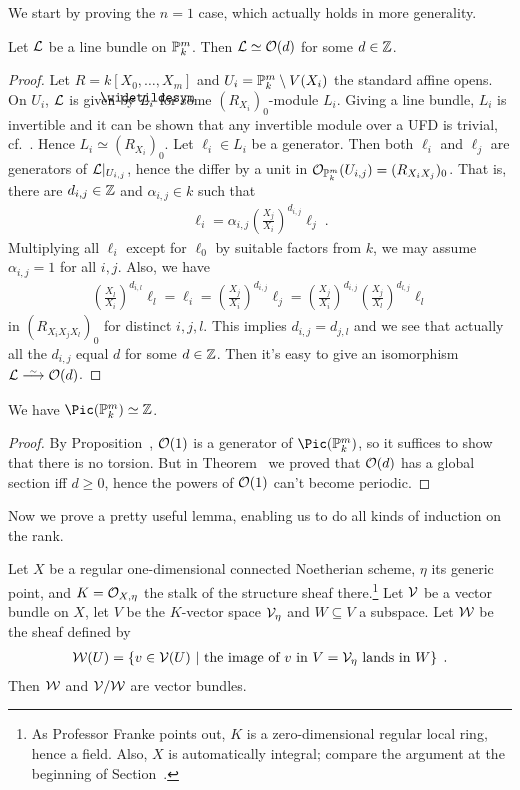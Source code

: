 \documentclass[a4paper,parskip=half,numbers=enddot, DIV=12]{scrreprt}
\begin{document}
We start by proving the $n=1$ case, which actually holds in more generality.
\begin{prop}
	Let $\mathcal{L}$ be a line bundle on $\mathbb{P}_k^m$. Then $\mathcal{L}\simeq\mathcal{O}(d)$ for some $d\in\mathbb{Z}$.
\end{prop}
\begin{proof}
	Let $R=k[X_0,\ldots,X_m]$ and $U_i=\mathbb{P}_k^m\setminus V(X_i)$ the standard affine opens. On $U_i$, $\mathcal{L}$ is given by $\snake{L}_i$ for some $(R_{X_i})_0$-module $L_i$. Giving a line bundle, $L_i$ is invertible and it can be shown that any invertible module over a UFD is trivial, cf.\ \cite[]{stacks-project}. Hence $L_i\simeq(R_{X_i})_0$. Let $\ell_i\in L_i$ be a generator. Then both $\ell_i$ and $\ell_j$ are generators of $\mathcal{L}|_{U_{i,j}}$, hence the differ by a unit in $\mathcal{O}_{\mathbb{P}_k^m}(U_{i,j})=(R_{X_iX_j})_0$. That is, there are $d_{i,j}\in\mathbb{Z}$ and $\alpha_{i,j}\in k$ such that
	\begin{align*}
		\ell_i=\alpha_{i,j} \left(\frac{X_j}{X_i}\right)^{d_{i,j}} \ell_j\;.
	\end{align*}
	Multiplying all $\ell_i$ except for $\ell_0$ by suitable factors from $k$, we may assume $\alpha_{i,j}=1$ for all $i,j$. Also, we have
	\begin{align*}
		\left(\frac{X_l}{X_i}\right)^{d_{i,l}}\ell_l=\ell_i=\left(\frac{X_j}{X_i}\right)^{d_{i,j}}\ell_j=\left(\frac{X_j}{X_i}\right)^{d_{i,j}}\left(\frac{X_j}{X_l}\right)^{d_{l,j}}\ell_l
	\end{align*}
	in $(R_{X_iX_jX_l})_0$ for distinct $i,j,l$. This implies $d_{i,j}=d_{j,l}$ and we see that actually all the $d_{i,j}$ equal $d$ for some $d\in\mathbb{Z}$. Then it's easy to give an isomorphism $\Ll\isomorphism\Oo(d)$.
\end{proof}
\begin{cor}
	We have $\Pic(\IP_k^m)\simeq \IZ$.
\end{cor}
\begin{proof}
	By Proposition~, $\mathcal{O}(1)$ is a generator of $\Pic(\IP_k^m)$, so it suffices to show that there is no torsion. But in Theorem~ we proved that $\mathcal{O}(d)$ has a global section iff $d\geq 0$, hence the powers of $\mathcal{O}(1)$ can't become periodic.
\end{proof}
Now we prove a pretty useful lemma, enabling us to do all kinds of induction on the rank.
\begin{lem}
	Let $X$ be a regular one-dimensional connected Noetherian scheme, $\eta$ its generic point, and $K=\mathcal{O}_{X,\eta}$ the stalk of the structure sheaf there.\footnote{As Professor Franke points out, $K$ is a zero-dimensional regular local ring, hence a field. Also, $X$ is automatically integral; compare the argument at the beginning of Section~.} Let $\mathcal{V}$ be a vector bundle on $X$, let $V$ be the $K$-vector space $\mathcal{V}_\eta$ and $W\subseteq V$ a subspace. Let $\mathcal{W}$ be the sheaf defined by
	\begin{align*}
		\mathcal{W}(U)=\left\{v\in\mathcal{V}(U)\ \middle|\ \text{the image of }v\text{ in }V=\mathcal{V}_\eta\text{ lands in }W\right\}\;.
	\end{align*}
	Then $\mathcal{W}$ and $\mathcal{V}/\mathcal{W}$ are vector bundles.
\end{lem}
\end{document}
